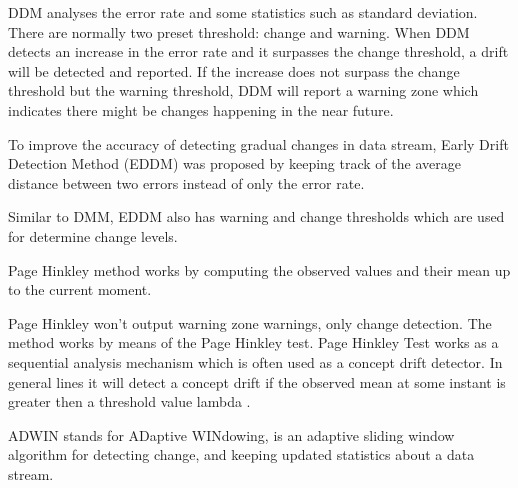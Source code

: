 DDM analyses the error rate and some statistics such as standard deviation. There are normally two preset threshold: change and warning. When DDM detects an increase in the error rate and it surpasses the change threshold, a drift will be detected and reported. If the increase does not surpass the change threshold but the warning threshold, DDM will report a warning zone which indicates there might be changes happening in the near future.

\begin{definition}
\label{eddm}
To improve the accuracy of detecting gradual changes in data stream, Early Drift Detection Method (EDDM) was proposed by keeping track of the average distance between two errors instead of only the error rate. 
\end{definition}

Similar to DMM, EDDM also has warning and change thresholds which are used for determine change levels.

\begin{definition}
\label{ph}

Page Hinkley \cite{PHT} method works by computing the observed values and their mean up to the current moment. 
\end{definition}

Page Hinkley won't output warning zone warnings, only change detection. The method works by means of the Page Hinkley test. Page Hinkley Test works as a sequential analysis mechanism which is often used as a concept drift detector. In general lines it will detect a concept drift if the observed mean at some instant is greater then a threshold value lambda \cite{PHT}.

\begin{definition}
\label{adwin}
ADWIN stands for ADaptive WINdowing, is an adaptive sliding window algorithm for detecting change, and keeping updated statistics about a data stream. 
\end{definition}

